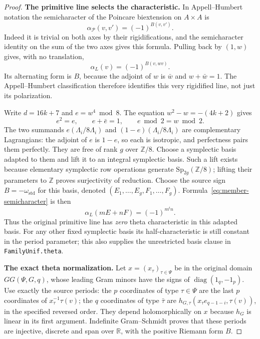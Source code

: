 \begin{proof}
\par\medskip\noindent\textbf{The primitive line selects the characteristic.}
In Appell--Humbert notation the semicharacter of the Poincare
biextension on $A\times A$ is
\[
       \alpha_{\mathcal P}(v,v')=(-1)^{B(v,v')}.
\]
Indeed it is trivial on both axes by their rigidifications, and
the semicharacter identity on the sum of the two axes gives this
formula.  Pulling back by $(1,w)$ gives, with no translation,
\begin{equation}\label{eq:member-semicharacter}
       \alpha_L(v)=(-1)^{B(v,wv)}.
\end{equation}
Its alternating form is $B$, because the adjoint of $w$ is
$\bar w$ and $w+\bar w=1$.  The Appell--Humbert classification
therefore identifies this very rigidified line, not just its
polarization\cite{member-milne-cm}.

Write $d=16k+7$ and $e=w^4\bmod8$.  The equation
$w^2-w=-(4k+2)$ gives
\[
       e^2=e,\qquad e+\bar e=1,\qquad e\bmod2=w\bmod2.
\]
The two summands $e(\Lambda_i/8\Lambda_i)$ and
$(1-e)(\Lambda_i/8\Lambda_i)$ are complementary Lagrangians:
the adjoint of $e$ is $1-e$, so each is isotropic, and perfectness
pairs them perfectly.  They are free of rank $g$ over
$\mathbb Z/8$.  Choose a symplectic basis adapted to them and
lift it to an integral symplectic basis.  Such a lift exists
because elementary symplectic row operations generate
$\mathrm{Sp}_{2g}(\mathbb Z/8)$; lifting their parameters to
$\mathbb Z$ proves surjectivity of reduction.  Choose the
source sign $B=-\omega_{\mathrm{std}}$ for this basis, denoted
$(E_1,\ldots,E_g,F_1,\ldots,F_g)$.
Formula~\eqref{eq:member-semicharacter} is then
\[
              \alpha_L(mE+nF)=(-1)^{m^tn}.
\]
Thus the original primitive line has \emph{zero} theta
characteristic in this adapted basis.  For any other fixed
symplectic basis its half-characteristic is still constant in
the period parameter; this also supplies the unrestricted
basis clause in \texttt{FamilyUnif.theta}.

\par\medskip\noindent\textbf{The exact theta normalization.}
Let $x=(x_\tau)_{\tau\in\Psi}$ be in the original domain
$GG(\Psi,G,q)$, whose leading Gram minors have the signs of
$\operatorname{diag}(1_q,-1_p)$.  Use exactly the source periods:
the $p$ coordinates of type $\tau\in\Psi$ are the last $p$
coordinates of $x_\tau^{-1}\tau(v)$; the $q$ coordinates of type
$\bar\tau$ are
$h_{G,\tau}(x_\tau e_{q-1-i},\tau(v))$, in the specified reversed
order.  They depend holomorphically on $x$ because $h_G$ is
linear in its first argument.  Indefinite Gram--Schmidt proves
that these periods are injective, discrete and span over
$\mathbb R$, with the positive Riemann form $B$.


\end{proof}
